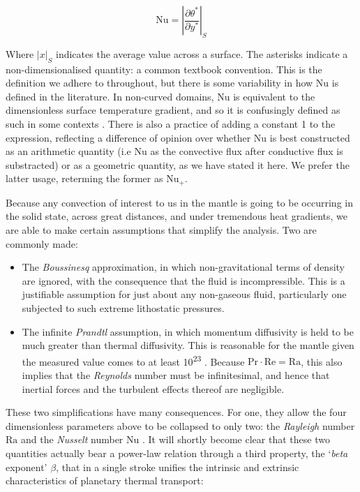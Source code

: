 \documentclass[a4paper,11pt,oneside]{book}
\begin{document}
\begin{equation}
\mathrm{Nu} = \left| \frac{\partial \theta^*}{\partial y^*} \right| _S
\end{equation}

Where $|x|_S$ indicates the average value across a surface. The asterisks indicate a non-dimensionalised quantity: a common textbook convention. This is the definition we adhere to throughout, but there is some variability in how $\mathrm{Nu}$ is defined in the literature. In non-curved domains, $\mathrm{Nu}$ is equivalent to the dimensionless surface temperature gradient, and so it is confusingly defined as such in some contexts \cite{Blankenbach1989-li}. There is also a practice of adding a constant 1 to the expression, reflecting a difference of opinion over whether $\mathrm{Nu}$ is best constructed as an arithmetic quantity (i.e $\mathrm{Nu}$ as the convective flux after conductive flux is substracted) or as a geometric quantity, as we have stated it here. We prefer the latter usage, reterming the former as $\mathrm{Nu}_{+}$.

Because any convection of interest to us in the mantle is going to be occurring in the solid state, across great distances, and under tremendous heat gradients, we are able to make certain assumptions that simplify the analysis. Two are commonly made:

\begin{itemize}
\item The \textit{Boussinesq} approximation, in which non-gravitational terms of density are ignored, with the consequence that the fluid is incompressible. This is a justifiable assumption for just about any non-gaseous fluid, particularly one subjected to such extreme lithostatic pressures.
\item The infinite \textit{Prandtl} assumption, in which momentum diffusivity is held to be much greater than thermal diffusivity. This is reasonable for the mantle given the measured value comes to at least 10\textsuperscript{23} \cite{Schubert2001-ea}. Because $\mathrm{Pr} \cdot \mathrm{Re} = \mathrm{Ra}$, this also implies that the \textit{Reynolds} number must be infinitesimal, and hence that inertial forces and the turbulent effects thereof are negligible.
\end{itemize}

These two simplifications have many consequences. For one, they allow the four dimensionless parameters above to be collapsed to only two: the \textit{Rayleigh} number $\mathrm{Ra}$ and the \textit{Nusselt} number $\mathrm{Nu}$ \cite{Turcotte1967-cz}. It will shortly become clear that these two quantities actually bear a power-law relation through a third property, the `\textit{beta} exponent' $\beta$, that in a single stroke unifies the intrinsic and extrinsic characteristics of planetary thermal transport:
\end{document}
